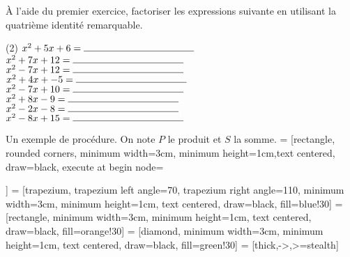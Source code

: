 \documentclass[a4paper,12pt]{report}
\begin{document}
\begin{exo}
	À l'aide du premier exercice, factoriser les expressions suivante en utilisant la quatrième identité remarquable.
\begin{tasks}(2)
\task $x^2+5x+6=\ligne{4}$ 
\task $x^2+7x+12=\ligne{4}$
\task $x^2-7x+12=\ligne{4}$
\task $x^2+4x+-5=\ligne{4}$
\task $x^2-7x+10=\ligne{4}$
\task $x^2+8x-9=\ligne{4}$
\task $x^2-2x-8=\ligne{4}$
\task $x^2-8x+15=\ligne{4}$
\end{tasks}	
\end{exo}

\afterpage{\bpage}
\newpage

Un exemple de procédure. On note $P$ le produit et $S$ la somme. 
 = [rectangle, rounded corners, minimum width=3cm, minimum height=1cm,text centered, draw=black,
execute at begin node={\begin{varwidth}{15em}},
execute at end node={\end{varwidth}}]
 = [trapezium, trapezium left angle=70, trapezium right angle=110, minimum width=3cm, minimum height=1cm, text centered, draw=black, fill=blue!30]
 = [rectangle, minimum width=3cm, minimum height=1cm, text centered, draw=black, fill=orange!30]
 = [diamond, minimum width=3cm, minimum height=1cm, text centered, draw=black, fill=green!30]
 = [thick,->,>=stealth]
\begin{center}
\end{center}
\end{document}
